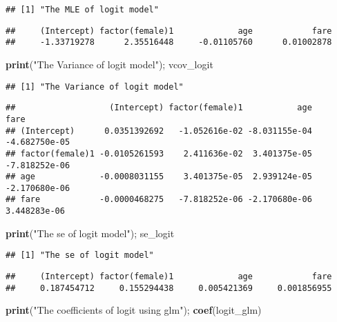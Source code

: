 \documentclass[
  12pt,
]{article}
\newenvironment{Shaded}{\begin{snugshade}}{\end{snugshade}}
\newcommand{\KeywordTok}[1]{\textcolor[rgb]{0.13,0.29,0.53}{\textbf{#1}}}
\newcommand{\NormalTok}[1]{#1}
\newcommand{\StringTok}[1]{\textcolor[rgb]{0.31,0.60,0.02}{#1}}
\begin{document}
\begin{verbatim}
## [1] "The MLE of logit model"
\end{verbatim}

\begin{verbatim}
##     (Intercept) factor(female)1             age            fare 
##     -1.33719278      2.35516448     -0.01105760      0.01002878
\end{verbatim}

\begin{Shaded}
\begin{Highlighting}[]
\KeywordTok{print}\NormalTok{(}\StringTok{"The Variance of logit model"}\NormalTok{); vcov\_logit}
\end{Highlighting}
\end{Shaded}

\begin{verbatim}
## [1] "The Variance of logit model"
\end{verbatim}

\begin{verbatim}
##                   (Intercept) factor(female)1           age          fare
## (Intercept)      0.0351392692   -1.052616e-02 -8.031155e-04 -4.682750e-05
## factor(female)1 -0.0105261593    2.411636e-02  3.401375e-05 -7.818252e-06
## age             -0.0008031155    3.401375e-05  2.939124e-05 -2.170680e-06
## fare            -0.0000468275   -7.818252e-06 -2.170680e-06  3.448283e-06
\end{verbatim}

\begin{Shaded}
\begin{Highlighting}[]
\KeywordTok{print}\NormalTok{(}\StringTok{"The se of logit model"}\NormalTok{); se\_logit}
\end{Highlighting}
\end{Shaded}

\begin{verbatim}
## [1] "The se of logit model"
\end{verbatim}

\begin{verbatim}
##     (Intercept) factor(female)1             age            fare 
##     0.187454712     0.155294438     0.005421369     0.001856955
\end{verbatim}

\begin{Shaded}
\begin{Highlighting}[]
\KeywordTok{print}\NormalTok{(}\StringTok{"The coefficients of logit using glm"}\NormalTok{); }\KeywordTok{coef}\NormalTok{(logit\_glm)}
\end{Highlighting}
\end{Shaded}
\end{document}
